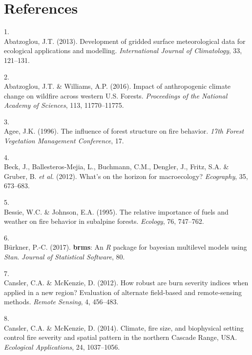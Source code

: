 \documentclass[]{article}
\begin{document}
\hypertarget{references}{%
\section*{References}\label{references}}

\hypertarget{refs}{}
\leavevmode\hypertarget{ref-abatzoglou2013}{}%
1.\\
Abatzoglou, J.T. (2013). Development of gridded surface meteorological
data for ecological applications and modelling. \emph{International
Journal of Climatology}, 33, 121--131.

\leavevmode\hypertarget{ref-abatzoglou2016}{}%
2.\\
Abatzoglou, J.T. \& Williams, A.P. (2016). Impact of anthropogenic
climate change on wildfire across western U.S. Forests.
\emph{Proceedings of the National Academy of Sciences}, 113,
11770--11775.

\leavevmode\hypertarget{ref-agee1996}{}%
3.\\
Agee, J.K. (1996). The influence of forest structure on fire behavior.
\emph{17th Forest Vegetation Management Conference}, 17.

\leavevmode\hypertarget{ref-beck2012}{}%
4.\\
Beck, J., Ballesteros-Mejia, L., Buchmann, C.M., Dengler, J., Fritz,
S.A. \& Gruber, B. \emph{et al.} (2012). What's on the horizon for
macroecology? \emph{Ecography}, 35, 673--683.

\leavevmode\hypertarget{ref-bessie1995}{}%
5.\\
Bessie, W.C. \& Johnson, E.A. (1995). The relative importance of fuels
and weather on fire behavior in subalpine forests. \emph{Ecology}, 76,
747--762.

\leavevmode\hypertarget{ref-burkner2017}{}%
6.\\
Bürkner, P.-C. (2017). \textbf{brms}: An \emph{R} package for bayesian
multilevel models using \emph{Stan}. \emph{Journal of Statistical
Software}, 80.

\leavevmode\hypertarget{ref-cansler2012}{}%
7.\\
Cansler, C.A. \& McKenzie, D. (2012). How robust are burn severity
indices when applied in a new region? Evaluation of alternate
field-based and remote-sensing methods. \emph{Remote Sensing}, 4,
456--483.

\leavevmode\hypertarget{ref-cansler2014}{}%
8.\\
Cansler, C.A. \& McKenzie, D. (2014). Climate, fire size, and
biophysical setting control fire severity and spatial pattern in the
northern Cascade Range, USA. \emph{Ecological Applications}, 24,
1037--1056.
\end{document}

